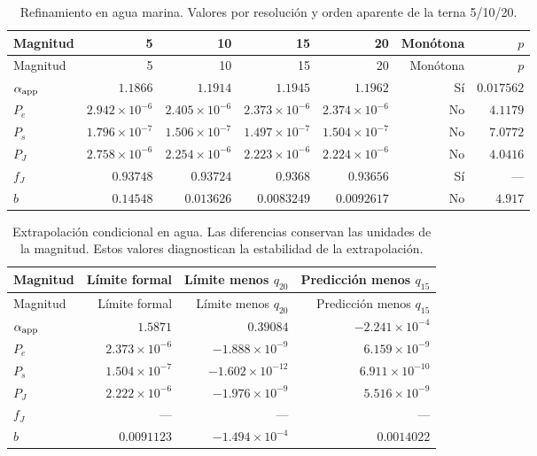 \begin{longtable}{lrrrrrr}
\caption{Refinamiento en agua marina. Valores por resolución y orden aparente de la terna 5/10/20.}\label{t:orden}\\
\hline Magnitud & 5 & 10 & 15 & 20 & Monótona & $p$ \\ \hline\endfirsthead
\hline Magnitud & 5 & 10 & 15 & 20 & Monótona & $p$ \\ \hline\endhead
$\alpha_{\rm app}$ & $1.1866$ & $1.1914$ & $1.1945$ & $1.1962$ & Sí & $0.017562$ \\
$P_e$ & $2.942\times 10^{-6}$ & $2.405\times 10^{-6}$ & $2.373\times 10^{-6}$ & $2.374\times 10^{-6}$ & No & $4.1179$ \\
$P_s$ & $1.796\times 10^{-7}$ & $1.506\times 10^{-7}$ & $1.497\times 10^{-7}$ & $1.504\times 10^{-7}$ & No & $7.0772$ \\
$P_J$ & $2.758\times 10^{-6}$ & $2.254\times 10^{-6}$ & $2.223\times 10^{-6}$ & $2.224\times 10^{-6}$ & No & $4.0416$ \\
$f_J$ & $0.93748$ & $0.93724$ & $0.9368$ & $0.93656$ & Sí & --- \\
$b$ & $0.14548$ & $0.013626$ & $0.0083249$ & $0.0092617$ & No & $4.917$ \\
\hline\end{longtable}\endgroup
\begingroup\small\setlength{\tabcolsep}{4pt}
\begin{longtable}{lrrr}
\caption{Extrapolación condicional en agua. Las diferencias conservan las unidades de la magnitud. Estos valores diagnostican la estabilidad de la extrapolación.}\label{t:extrap}\\
\hline Magnitud & Límite formal & Límite menos $q_{20}$ & Predicción menos $q_{15}$ \\ \hline\endfirsthead
\hline Magnitud & Límite formal & Límite menos $q_{20}$ & Predicción menos $q_{15}$ \\ \hline\endhead
$\alpha_{\rm app}$ & $1.5871$ & $0.39084$ & $-2.241\times 10^{-4}$ \\
$P_e$ & $2.373\times 10^{-6}$ & $-1.888\times 10^{-9}$ & $6.159\times 10^{-9}$ \\
$P_s$ & $1.504\times 10^{-7}$ & $-1.602\times 10^{-12}$ & $6.911\times 10^{-10}$ \\
$P_J$ & $2.222\times 10^{-6}$ & $-1.976\times 10^{-9}$ & $5.516\times 10^{-9}$ \\
$f_J$ & --- & --- & --- \\
$b$ & $0.0091123$ & $-1.494\times 10^{-4}$ & $0.0014022$ \\
\hline\end{longtable}\endgroup
